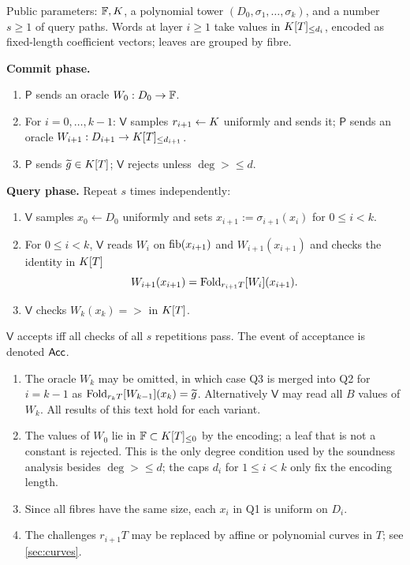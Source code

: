 \begin{protocol}\label{prot:sfri}
Public parameters: $\mathbb{F},K$, a polynomial tower $(D_0,\sigma_1,\dots,\sigma_k)$, and a number
$s\ge1$ of query paths. Words at layer $i\ge1$ take values in $K[T]_{\le d_i}$, encoded as
fixed-length coefficient vectors; leaves are grouped by fibre.

\smallskip\noindent\textbf{Commit phase.}
\begin{enumerate}[label=\textup{C\arabic*.}]
\item $\mathsf P$ sends an oracle $W_0:D_0\to\mathbb{F}$.
\item For $i=0,\dots,k-1$: $\mathsf V$ samples $r_{i+1}\leftarrow K$ uniformly and sends it;
$\mathsf P$ sends an oracle $W_{i+1}:D_{i+1}\to K[T]_{\le d_{i+1}}$.
\item $\mathsf P$ sends $\widetilde g\in K[T]$; $\mathsf V$ rejects unless $\deg\gt\le d$.
\end{enumerate}

\smallskip\noindent\textbf{Query phase.} Repeat $s$ times independently:
\begin{enumerate}[label=\textup{Q\arabic*.}]
\item $\mathsf V$ samples $x_0\leftarrow D_0$ uniformly and sets
$x_{i+1}:=\sigma_{i+1}(x_i)$ for $0\le i<k$.
\item For $0\le i<k$, $\mathsf V$ reads $W_i$ on $\mathrm{fib}(x_{i+1})$ and $W_{i+1}(x_{i+1})$ and
checks the identity in $K[T]$
\[
W_{i+1}(x_{i+1})=\mathrm{Fold}_{r_{i+1}T}[W_i](x_{i+1}).
\]
\item $\mathsf V$ checks $W_k(x_k)=\gt$ in $K[T]$.
\end{enumerate}
$\mathsf V$ accepts iff all checks of all $s$ repetitions pass. The event of acceptance is
denoted $\mathsf{Acc}$.
\end{protocol}

\begin{remark}\label{rem:variants}
\begin{enumerate}[label=\textup{(\roman*)}]
\item The oracle $W_k$ may be omitted, in which case Q3 is merged into Q2 for $i=k-1$ as
$\mathrm{Fold}_{r_kT}[W_{k-1}](x_k)=\widetilde g$. Alternatively $\mathsf V$ may read all $B$ values of $W_k$.
All results of this text hold for each variant.
\item The values of $W_0$ lie in $\mathbb{F}\subset K[T]_{\le 0}$ by the encoding; a leaf that is not
a constant is rejected. This is the only degree condition used by the soundness analysis
besides $\deg\gt\le d$; the caps $d_i$ for $1\le i<k$ only fix the encoding length.
\item Since all fibres have the same size, each $x_i$ in Q1 is uniform on $D_i$.
\item The challenges $r_{i+1}T$ may be replaced by affine or polynomial curves in $T$;
see \cref{sec:curves}.
\end{enumerate}
\end{remark}

